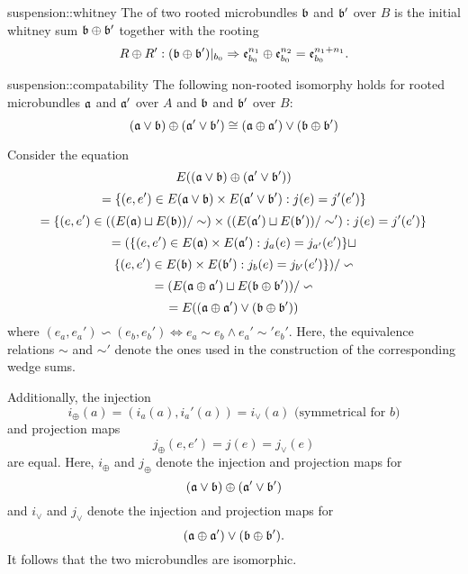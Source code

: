 \begin{mydefinition}{suspension::whitney}{}
    The  of two rooted microbundles $\bb$ and $\bb'$ over $B$
    is the initial whitney sum $\whitney{\bb}{\bb'}$ together with the rooting
    \[ \germdef{\whitney{R}{R'}}{(\whitney{\bb}{\bb'})\restr{b_0}}{\whitney{\be[n_1]{b_0}}{\be[n_2]{b_0}} = \be[n_1 + n_1]{b_0}}. \]
\end{mydefinition}

\begin{mylemma}{suspension::compatability}{}   
    The following non-rooted isomorphy holds
    for rooted microbundles $\ba$ and $\ba'$ over $A$
    and $\bb$ and $\bb'$ over $B$: 
    \[
        \whitney{(\ba \vee \bb)}{(\ba' \vee \bb')}
        \cong (\whitney{\ba}{\ba'}) \vee (\whitney{\bb}{\bb'})
    \]
\end{mylemma}
\begin{myproof}
    Consider the equation
    \[ E(\whitney{(\ba \vee \bb)}{(\ba' \vee \bb')}) \]
    \[ = \set{(e, e') \in E(\ba \vee \bb) \times E(\ba' \vee \bb')}{j(e) = j'(e')} \]
    \[ = \set{(e, e') \in ((E(\ba) \sqcup E(\bb)) / \sim) \times ((E(\ba') \sqcup E(\bb')) / \sim')}{j(e) = j'(e')} \]
    \[ = (\set{(e, e') \in E(\ba) \times E(\ba')}{j_a(e) = j_{a'}(e')} \sqcup \]
    \[ \set{(e, e') \in E(\bb) \times E(\bb')}{j_b(e) = j_{b'}(e')}) / \backsim \]
    \[ = (E(\whitney{\ba}{\ba'}) \sqcup E(\whitney{\bb}{\bb'})) / \backsim \]
    \[ = E((\whitney{\ba}{\ba'}) \vee (\whitney{\bb}{\bb'})) \]
    where $(e_a, e_a') \backsim (e_b, e_b') \iff e_a \sim e_b \land e_a' \sim' e_b'$.
    Here, the equivalence relations $\sim$ and $\sim'$ denote the ones
    used in the construction of the corresponding wedge sums.

    Additionally, the injection
    \[ i_\oplus(a) = (i_a(a), i_a'(a)) = i_\vee(a) \text{ (symmetrical for $b$)}\]
    and projection maps
    \[ j_\oplus(e, e') = j(e) =  j_\vee(e) \]
    are equal.
    Here, $i_\oplus$ and $j_\oplus$ denote the injection and projection maps for
    \[ \whitney{(\ba \vee \bb)}{(\ba' \vee \bb')} \]
    and $i_\vee$ and $j_\vee$ denote the injection and projection maps for
    \[ (\whitney{\ba}{\ba'}) \vee (\whitney{\bb}{\bb'}). \]
    It follows that the two microbundles are isomorphic.
\end{myproof}